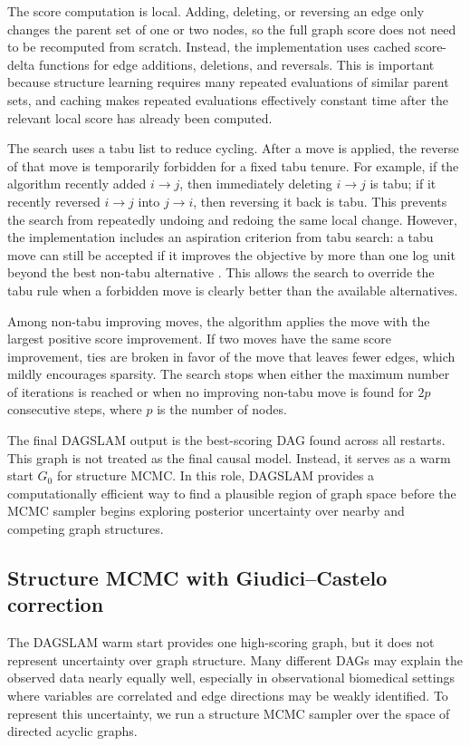 \documentclass[11pt]{article}
\begin{document}
The score computation is local. Adding, deleting, or reversing an edge only changes the parent set of one or two nodes, so the full graph score does not need to be recomputed from scratch. Instead, the implementation uses cached score-delta functions for edge additions, deletions, and reversals. This is important because structure learning requires many repeated evaluations of similar parent sets, and caching makes repeated evaluations effectively constant time after the relevant local score has already been computed.

The search uses a tabu list to reduce cycling. After a move is applied, the reverse of that move is temporarily forbidden for a fixed tabu tenure. For example, if the algorithm recently added $i \to j$, then immediately deleting $i \to j$ is tabu; if it recently reversed $i \to j$ into $j \to i$, then reversing it back is tabu. This prevents the search from repeatedly undoing and redoing the same local change. However, the implementation includes an aspiration criterion from tabu search: a tabu move can still be accepted if it improves the objective by more than one log unit beyond the best non-tabu alternative \citep{Glover1989}. This allows the search to override the tabu rule when a forbidden move is clearly better than the available alternatives.

Among non-tabu improving moves, the algorithm applies the move with the largest positive score improvement. If two moves have the same score improvement, ties are broken in favor of the move that leaves fewer edges, which mildly encourages sparsity. The search stops when either the maximum number of iterations is reached or when no improving non-tabu move is found for $2p$ consecutive steps, where $p$ is the number of nodes.

The final DAGSLAM output is the best-scoring DAG found across all restarts. This graph is not treated as the final causal model. Instead, it serves as a warm start $G_0$ for structure MCMC. In this role, DAGSLAM provides a computationally efficient way to find a plausible region of graph space before the MCMC sampler begins exploring posterior uncertainty over nearby and competing graph structures.


\subsection{Structure MCMC with Giudici--Castelo correction}

The DAGSLAM warm start provides one high-scoring graph, but it does not represent uncertainty over graph structure. Many different DAGs may explain the observed data nearly equally well, especially in observational biomedical settings where variables are correlated and edge directions may be weakly identified. To represent this uncertainty, we run a structure MCMC sampler over the space of directed acyclic graphs.
\end{document}
